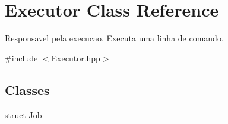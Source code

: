 \hypertarget{classExecutor}{
\section{Executor Class Reference}
\label{classExecutor}
}


Responsavel pela execucao. Executa uma linha de comando.  




{\ttfamily \#include $<$Executor.hpp$>$}

\subsection*{Classes}
\begin{DoxyCompactItemize}
\item 
struct \hyperlink{structExecutor_1_1Job}{Job}
\end{DoxyCompactItemize}
